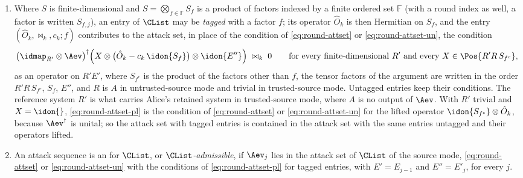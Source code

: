 \begin{definition}
\begin{enumerate}[label=(\roman*),leftmargin=2.4em]
{  set} of $\CList$ is
  \begin{equation}\label{eq:round-attset}
    \AttSet_{\CList}(E',\,S E'')\coloneqq
    \Big\{\Aev\in\mathrm{CPTP}(E',S E''):\
    \Aev^{\dagger}\big(\hat O_k\otimes\idon{E''}\big)
    \bowtie_k c_k\,\idon{E'}\ \ \forall k\Big\}
    \qquad\text{(trusted-source mode)},
  \end{equation}
  and, with the constraint operator lifted to the larger supplied system,
  \begin{equation}\label{eq:round-attset-un}
    \AttSet_{\CList}(E',\,A S E'')\coloneqq
    \Big\{\Aev\in\mathrm{CPTP}(E',A S E''):\
    \Aev^{\dagger}\big(\idon{A}\otimes\hat O_k\otimes\idon{E''}\big)
    \bowtie_k c_k\,\idon{E'}\ \ \forall k\Big\}
  \end{equation}
  in untrusted-source mode; the two are distinguished by the output system
  named in the argument. For $\CList=\varnothing$ the condition is empty and
  $\AttSet_{\varnothing}=\mathrm{CPTP}$.
\item Where $S$ is finite-dimensional and $S=\bigotimes_{f\in\mathbb{F}}S_f$
  is a product of factors indexed by a finite ordered set $\mathbb{F}$ (with a
  round index as well, a factor is written $S_{f,j}$), an entry of
  $\CList$ may be \emph{tagged} with a factor $f$; its operator $\hat O_k$ is
  then Hermitian on $S_f$, and the entry $(\hat O_k,\bowtie_k,c_k;f)$
  contributes to the attack set, in place of the condition of
  \eqref{eq:round-attset} or \eqref{eq:round-attset-un}, the condition
  \begin{equation}\label{eq:round-attset-pl}
    \big(\idmap_{R'}\otimes\Aev\big)^{\dagger}
    \Big(X\otimes\big(\hat O_k-c_k\,\idon{S_f}\big)\otimes\idon{E''}\Big)
    \;\bowtie_k\;0
    \qquad\text{for every finite-dimensional }R'\text{ and every }
    X\in\Pos{R'R\,S_{f^c}} ,
  \end{equation}
  as an operator on $R'E'$, where $S_{f^c}$ is the product of the factors
  other than $f$, the tensor factors of the argument are written in the order
  $R'R\,S_{f^c}$, $S_f$, $E''$, and $R$ is $A$ in untrusted-source mode and
  trivial in trusted-source mode. Untagged entries keep their conditions. The
  reference system $R'$ is what carries Alice's retained system in
  trusted-source mode, where $A$ is no output of $\Aev$. With $R'$ trivial and
  $X=\idon{}$, \eqref{eq:round-attset-pl} is the condition of
  \eqref{eq:round-attset} or \eqref{eq:round-attset-un} for the lifted operator
  $\idon{S_{f^c}}\otimes\hat O_k$, because $\Aev^{\dagger}$ is unital; so the
  attack set with tagged entries is contained in the attack set with the same
  entries untagged and their operators lifted.
\item An attack sequence is an  for
  $\CList$, or \emph{$\CList$-admissible}, if $\Aev_j$ lies in the attack set
  of $\CList$ of the source mode, \eqref{eq:round-attset} or
  \eqref{eq:round-attset-un} with the conditions of
  \eqref{eq:round-attset-pl} for tagged entries, with $E'=E_{j-1}$ and
  $E''=E'_j$, for every $j$.
\end{enumerate}
\end{definition}
